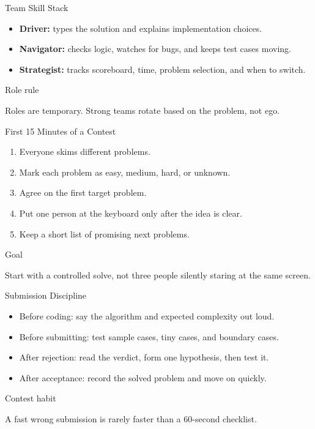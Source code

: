 \documentclass[aspectratio=169,11pt]{beamer}
\newenvironment{cpbox}[1]{%
  \begin{block}{#1}
  }{%
  \end{block}
}
\begin{document}
\begin{frame}{Team Skill Stack}
  \begin{itemize}
    \item \textbf{Driver:} types the solution and explains implementation choices.
    \item \textbf{Navigator:} checks logic, watches for bugs, and keeps test cases moving.
    \item \textbf{Strategist:} tracks scoreboard, time, problem selection, and when to switch.
  \end{itemize}

  \vspace{0.35cm}
  \begin{cpbox}{Role rule}
    Roles are temporary. Strong teams rotate based on the problem, not ego.
  \end{cpbox}
\end{frame}

\begin{frame}{First 15 Minutes of a Contest}
  \begin{enumerate}
    \item Everyone skims different problems.
    \item Mark each problem as easy, medium, hard, or unknown.
    \item Agree on the first target problem.
    \item Put one person at the keyboard only after the idea is clear.
    \item Keep a short list of promising next problems.
  \end{enumerate}

  \vspace{0.35cm}
  \begin{cpbox}{Goal}
    Start with a controlled solve, not three people silently staring at the same screen.
  \end{cpbox}
\end{frame}

\begin{frame}{Submission Discipline}
  \begin{itemize}
    \item Before coding: say the algorithm and expected complexity out loud.
    \item Before submitting: test sample cases, tiny cases, and boundary cases.
    \item After rejection: read the verdict, form one hypothesis, then test it.
    \item After acceptance: record the solved problem and move on quickly.
  \end{itemize}

  \vspace{0.35cm}
  \begin{cpbox}{Contest habit}
    A fast wrong submission is rarely faster than a 60-second checklist.
  \end{cpbox}
\end{frame}
\end{document}
